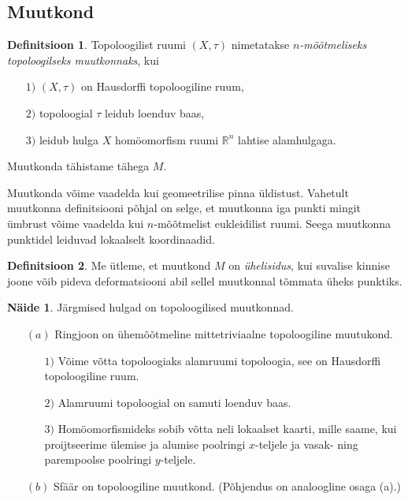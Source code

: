 \documentclass[12pt]{article}
\theoremstyle{plain}
\theoremstyle{definition}
\newtheorem{definitsioon}{Definitsioon}[section]
\newtheorem{naide}{Näide}[section]
\numberwithin{equation}{section}
\def\R{{\mathbb R}}
\begin{document}
\subsection{Muutkond}

\begin{definitsioon}
Topoloogilist ruumi $\left(X, \tau\right)$ nimetatakse 
\emph{$n$-mõõtmeliseks topoloogilseks muutkonnaks}, kui
\begin{itemize}
\item[$1)$] $\left(X, \tau\right)$ on Hausdorffi topoloogiline ruum,
\item[$2)$] topoloogial $\tau$ leidub loenduv baas,
\item[$3)$] leidub hulga $X$ homöomorfism ruumi $\R^n$ lahtise 
alamhulgaga.
\end{itemize}
Muutkonda tähistame tähega $M$.
\end{definitsioon}

Muutkonda võime vaadelda kui geomeetrilise pinna üldistust. 
Vahetult muutkonna definitsiooni põhjal on selge, et muutkonna 
iga punkti mingit ümbrust võime vaadelda kui $n$-mõõtmelist 
eukleidilist ruumi. Seega muutkonna punktidel leiduvad lokaalselt 
koordinaadid.

\begin{definitsioon}
Me ütleme, et muutkond $M$ on \emph{ühelisidus}, kui suvalise 
kinnise joone võib pideva deformatsiooni abil sellel muutkonnal 
tõmmata üheks punktiks.
\end{definitsioon}

\begin{naide}
Järgmised hulgad on topoloogilised muutkonnad.
\begin{itemize}
\item[$(a)$] Ringjoon on ühemõõtmeline mittetriviaalne topoloogiline 
muutukond.
\begin{itemize}
\item[$1)$] Võime võtta topoloogiaks alamruumi topoloogia, see on 
Hausdorffi topoloogiline ruum.
\item[$2)$] Alamruumi topoloogial on samuti loenduv baas.
\item[$3)$] Homöomorfismideks sobib võtta neli lokaalset kaarti, 
mille saame, kui proijtseerime ülemise ja alumise poolringi 
$x$-teljele ja vasak- ning parempoolse poolringi $y$-teljele.
\end{itemize}
\item[$(b)$] Sfäär on topoloogiline muutkond. (Põhjendus on 
analoogline osaga (a).)
\end{itemize}
\end{naide}
\end{document}
